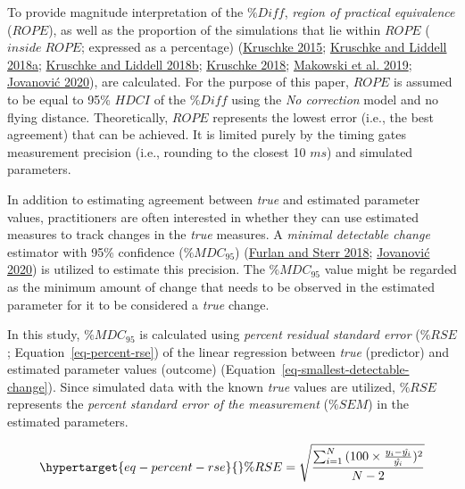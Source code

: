 \documentclass[
  letterpaper,
  DIV=11,
  numbers=noendperiod]{scrartcl}
\begin{document}
To provide magnitude interpretation of the \(\%Diff\), \emph{region of
practical equivalence} (\(ROPE\)), as well as the proportion of the
simulations that lie within \(ROPE\) (\(inside \; ROPE\); expressed as a
percentage)
(\protect\hyperlink{ref-kruschkeDoingBayesianData2015}{Kruschke 2015};
\protect\hyperlink{ref-kruschkeBayesianDataAnalysis2018}{Kruschke and
Liddell 2018a};
\protect\hyperlink{ref-kruschkeBayesianNewStatistics2018}{Kruschke and
Liddell 2018b};
\protect\hyperlink{ref-kruschkeRejectingAcceptingParameter2018}{Kruschke
2018};
\protect\hyperlink{ref-makowskiBayestestRDescribingEffects2019}{Makowski
et al. 2019};
\protect\hyperlink{ref-jovanovicBmbstatsBootstrapMagnitudebased2020}{Jovanović
2020}), are calculated. For the purpose of this paper, \(ROPE\) is
assumed to be equal to 95\% \(HDCI\) of the \(\%Diff\) using the
\emph{No correction} model and no flying distance. Theoretically,
\(ROPE\) represents the lowest error (i.e., the best agreement) that can
be achieved. It is limited purely by the timing gates measurement
precision (i.e., rounding to the closest 10 \(ms\)) and simulated
parameters.

In addition to estimating agreement between \emph{true} and estimated
parameter values, practitioners are often interested in whether they can
use estimated measures to track changes in the \emph{true} measures. A
\emph{minimal detectable change} estimator with 95\% confidence
(\(\%MDC_{95}\))
(\protect\hyperlink{ref-furlanApplicabilityStandardError2018}{Furlan and
Sterr 2018};
\protect\hyperlink{ref-jovanovicBmbstatsBootstrapMagnitudebased2020}{Jovanović
2020}) is utilized to estimate this precision. The \(\%MDC_{95}\) value
might be regarded as the minimum amount of change that needs to be
observed in the estimated parameter for it to be considered a
\emph{true} change.

In this study, \(\%MDC_{95}\) is calculated using \emph{percent residual
standard error} (\(\%RSE\); Equation~\ref{eq-percent-rse}) of the linear
regression between \emph{true} (predictor) and estimated parameter
values (outcome) (Equation~\ref{eq-smallest-detectable-change}). Since
simulated data with the known \emph{true} values are utilized, \(\%RSE\)
represents the \emph{percent standard error of the measurement}
(\(\%SEM\)) in the estimated parameters.

\begin{equation}\protect\hypertarget{eq-percent-rse}{}{
  \%RSE = \sqrt{\frac{\sum_{i=1}^N{(100 \times \frac{y_i - \hat{y_i}}{\hat{y_i}})^2}}{N-2}}
}\label{eq-percent-rse}\end{equation}
\end{document}
